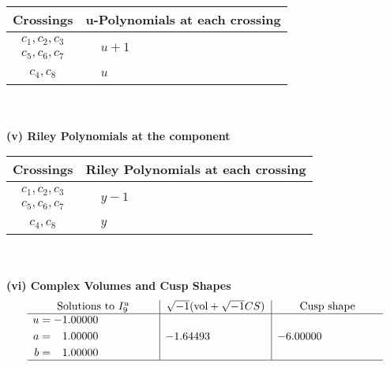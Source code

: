 \documentclass[1p]{elsarticle_modified}
\theoremstyle{definition}
\newcommand{\I}{\sqrt{-1}}
\begin{document}
\begin{tabular}{m{50pt}|m{274pt}}
Crossings & \hspace{64pt}u-Polynomials at each crossing \\
\hline $$\begin{aligned}c_{1},c_{2},c_{3}\\c_{5},c_{6},c_{7}\end{aligned}$$&$\begin{aligned}
&u+1
\end{aligned}$\\
\hline $$\begin{aligned}c_{4},c_{8}\end{aligned}$$&$\begin{aligned}
&u
\end{aligned}$\\
\hline
\end{tabular}\\~\\
\newpage\renewcommand{\arraystretch}{1}
\flushleft \textbf{(v) Riley Polynomials at the component}\newline \\
\begin{tabular}{m{50pt}|m{274pt}}
Crossings & \hspace{64pt}Riley Polynomials at each crossing \\
\hline $$\begin{aligned}c_{1},c_{2},c_{3}\\c_{5},c_{6},c_{7}\end{aligned}$$&$\begin{aligned}
&y-1
\end{aligned}$\\
\hline $$\begin{aligned}c_{4},c_{8}\end{aligned}$$&$\begin{aligned}
&y
\end{aligned}$\\
\hline
\end{tabular}\\~\\
\newpage\flushleft \textbf{(vi) Complex Volumes and Cusp Shapes}
$$\begin{array}{c|c|c}  
\text{Solutions to }I^u_{9}& \I (\text{vol} + \sqrt{-1}CS) & \text{Cusp shape}\\
 \hline 
\begin{aligned}
u &= -1.00000\phantom{ +0.000000I} \\
a &= \phantom{-}1.00000\phantom{ +0.000000I} \\
b &= \phantom{-}1.00000\phantom{ +0.000000I}\end{aligned}
 & -1.64493\phantom{ +0.000000I} & -6.00000\phantom{ +0.000000I}\\
 \hline 
 \end{array}$$\newpage\newpage\renewcommand{\arraystretch}{1}
\end{document}
